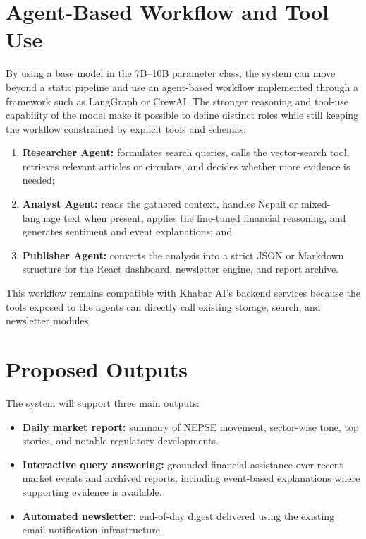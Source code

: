 \documentclass[12pt,a4paper]{report}
\begin{document}
\section{Agent-Based Workflow and Tool Use}
By using a base model in the 7B--10B parameter class, the system can move beyond a static pipeline and use an agent-based workflow implemented through a framework such as LangGraph or CrewAI. The stronger reasoning and tool-use capability of the model make it possible to define distinct roles while still keeping the workflow constrained by explicit tools and schemas:
\begin{enumerate}[leftmargin=1.6em]
    \item \textbf{Researcher Agent:} formulates search queries, calls the vector-search tool, retrieves relevant articles or circulars, and decides whether more evidence is needed;
    \item \textbf{Analyst Agent:} reads the gathered context, handles Nepali or mixed-language text when present, applies the fine-tuned financial reasoning, and generates sentiment and event explanations; and
    \item \textbf{Publisher Agent:} converts the analysis into a strict JSON or Markdown structure for the React dashboard, newsletter engine, and report archive.
\end{enumerate}

This workflow remains compatible with Khabar AI's backend services because the tools exposed to the agents can directly call existing storage, search, and newsletter modules.

\section{Proposed Outputs}
The system will support three main outputs:
\begin{itemize}[leftmargin=1.6em]
    \item \textbf{Daily market report:} summary of \ac{NEPSE} movement, sector-wise tone, top stories, and notable regulatory developments.
    \item \textbf{Interactive query answering:} grounded financial assistance over recent market events and archived reports, including event-based explanations where supporting evidence is available.
    \item \textbf{Automated newsletter:} end-of-day digest delivered using the existing email-notification infrastructure.
\end{itemize}
\end{document}
